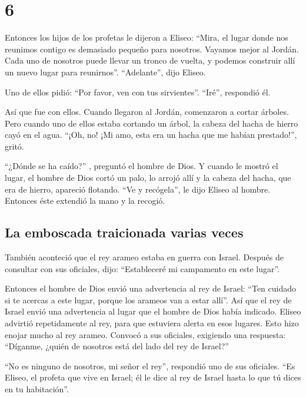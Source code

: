 \hypertarget{section-5}{%
\section{6}\label{section-5}}

 Entonces los hijos de los profetas le dijeron a Eliseo:
``Mira, el lugar donde nos reunimos contigo es demasiado pequeño para
nosotros.  Vayamos mejor al Jordán. Cada uno de nosotros
puede llevar un tronco de vuelta, y podemos construir allí un nuevo
lugar para reunirnos''. ``Adelante'', dijo Eliseo.

 Uno de ellos pidió: ``Por favor, ven con tus
sirvientes''. ``Iré'', respondió él.

 Así que fue con ellos. Cuando llegaron al Jordán,
comenzaron a cortar árboles.  Pero cuando uno de ellos
estaba cortando un árbol, la cabeza del hacha de hierro cayó en el agua.
``¡Oh, no! ¡Mi amo, esta era un hacha que me habían prestado!'', gritó.

 ``¿Dónde se ha caído?'' , preguntó el hombre de Dios. Y
cuando le mostró el lugar, el hombre de Dios cortó un palo, lo arrojó
allí y la cabeza del hacha, que era de hierro, apareció flotando.
 ``Ve y recógela'', le dijo Eliseo al hombre. Entonces
éste extendió la mano y la recogió.

\hypertarget{la-emboscada-traicionada-varias-veces}{%
\subsection{La emboscada traicionada varias
veces}\label{la-emboscada-traicionada-varias-veces}}

 También aconteció que el rey arameo estaba en guerra con
Israel. Después de consultar con sus oficiales, dijo: ``Estableceré mi
campamento en este lugar''.

 Entonces el hombre de Dios envió una advertencia al rey
de Israel: ``Ten cuidado si te acercas a este lugar, porque los arameos
van a estar allí''.  Así que el rey de Israel envió una
advertencia al lugar que el hombre de Dios había indicado. Eliseo
advirtió repetidamente al rey, para que estuviera alerta en esos
lugares.  Esto hizo enojar mucho al rey arameo. Convocó a
sus oficiales, exigiendo una respuesta: ``Díganme, ¿quién de nosotros
está del lado del rey de Israel?''

 ``No es ninguno de nosotros, mi señor el rey'',
respondió uno de sus oficiales. ``Es Eliseo, el profeta que vive en
Israel; él le dice al rey de Israel hasta lo que tú dices en tu
habitación''.


